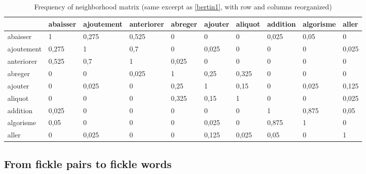 \documentclass{elsarticle}
\begin{document}
\begin{table}
\begin{tabular}{|l|l|l|l|l|l|l|l|l|l|}
\hline
 & abaisser & ajoutement & anteriorer& abreger & ajouter & aliquot & addition & algorisme & aller \\ \hline
abaisser  & \cellcolor{gris} 1 & \cellcolor{gris} 0,275 & \cellcolor{gris} 0,525 & 0 & 0 & 0 & \cellcolor{grisclair} 0,025 & \cellcolor{grisclair} 0,05 & 0 \\ \hline
ajoutement  & \cellcolor{gris} 0,275 & \cellcolor{gris} 1 & \cellcolor{gris} 0,7 & 0 & \cellcolor{grisclair} 0,025 & 0 & 0 & 0 & \cellcolor{grisclair} 0,025 \\ \hline
anteriorer & \cellcolor{gris} 0,525 & \cellcolor{gris} 0,7 & \cellcolor{gris} 1 & \cellcolor{grisclair} 0,025 & 0 & 0 & 0 & 0 & 0 \\ \hline
abreger & 0 & 0 &\cellcolor{grisclair} 0,025& \cellcolor{gris} 1 & \cellcolor{gris} 0,25 & \cellcolor{gris} 0,325 & 0 & 0 & 0 \\ \hline
ajouter & 0 & \cellcolor{grisclair} 0,025 & 0& \cellcolor{gris} 0,25 & \cellcolor{gris} 1 & \cellcolor{grisclair} 0,15 & 0 & \cellcolor{grisclair} 0,025 & \cellcolor{grisclair} 0,125 \\ \hline
aliquot & 0 & 0 & 0& \cellcolor{gris} 0,325 & \cellcolor{grisclair} 0,15 & \cellcolor{gris} 1 & 0 & 0 & \cellcolor{grisclair} 0,025 \\ \hline
addition & \cellcolor{grisclair} 0,025 & 0 & 0& 0 & 0 & 0 & \cellcolor{gris} 1 & \cellcolor{gris} 0,875 & \cellcolor{grisclair} 0,05 \\ \hline
algorisme & \cellcolor{grisclair} 0,05 & 0 & 0& 0 & \cellcolor{grisclair} 0,025 & 0 & \cellcolor{gris} 0,875 & \cellcolor{gris} 1 & 0 \\ \hline
aller & 0 & \cellcolor{grisclair} 0,025 & 0& 0 & \cellcolor{grisclair} 0,125 & \cellcolor{grisclair} 0,025 & \cellcolor{grisclair} 0,05 & 0 & \cellcolor{gris} 1 \\ \hline
\end{tabular}

\caption{Frequency of neighborhood matrix (same excerpt as \ref{bertin1}, with row and columns reorganized)}
\label{bertin2}
\end{table}

\subsection{From fickle pairs to fickle words}
\end{document}

